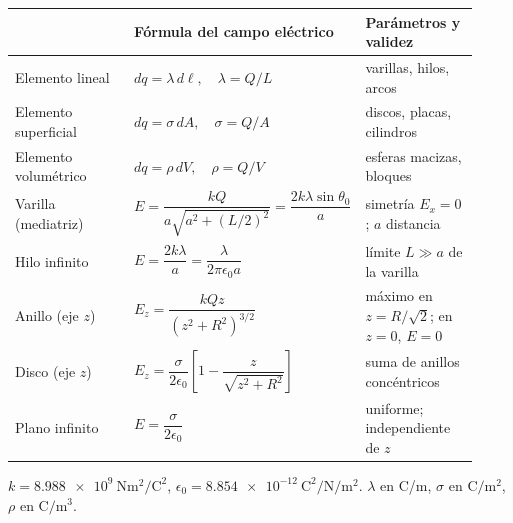 \documentclass[11pt]{article}
\begin{document}
\renewcommand{\arraystretch}{1.65}
\begin{center}\small
\begin{tabular}{>{\raggedright\arraybackslash}p{0.27\linewidth} >{\centering\arraybackslash}p{0.40\linewidth} >{\raggedright\arraybackslash}p{0.25\linewidth}}
\toprule
{\sffamily\small\bfseries Configuración} & {\sffamily\small\bfseries Fórmula del campo eléctrico} & {\sffamily\small\bfseries Parámetros y validez}\\
\midrule
Elemento lineal & $dq = \lambda\,d\ell,\quad \lambda = Q/L$ & varillas, hilos, arcos \\
Elemento superficial & $dq = \sigma\,dA,\quad \sigma = Q/A$ & discos, placas, cilindros \\
Elemento volumétrico & $dq = \rho\,dV,\quad \rho = Q/V$ & esferas macizas, bloques \\
Varilla (mediatriz) & $E = \dfrac{kQ}{a\sqrt{a^2+(L/2)^2}} = \dfrac{2k\lambda\sin\theta_0}{a}$ & simetría $E_x=0$; $a$ distancia \\
Hilo infinito & $E = \dfrac{2k\lambda}{a} = \dfrac{\lambda}{2\pi\epsilon_0 a}$ & límite $L\gg a$ de la varilla \\
Anillo (eje $z$) & $E_z = \dfrac{kQz}{(z^2+R^2)^{3/2}}$ & máximo en $z=R/\sqrt{2}$; en $z=0$, $E=0$ \\
Disco (eje $z$) & $E_z = \dfrac{\sigma}{2\epsilon_0}\left[1 - \dfrac{z}{\sqrt{z^2+R^2}}\right]$ & suma de anillos concéntricos \\
Plano infinito & $E = \dfrac{\sigma}{2\epsilon_0}$ & uniforme; independiente de $z$ \\
\bottomrule
\end{tabular}
\end{center}
{\small\color{e10muted}$k=\SI{8,988e9}{\newton\metre\squared\per\coulomb\squared}$, $\epsilon_0=\SI{8,854e-12}{\coulomb\squared\per\newton\per\metre\squared}$. $\lambda$ en C/m, $\sigma$ en $\mathrm{C/m^2}$, $\rho$ en $\mathrm{C/m^3}$.}
\end{document}
